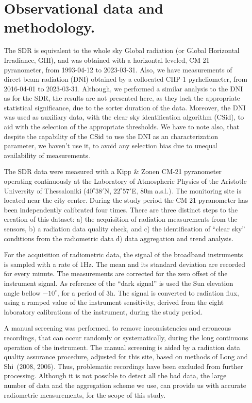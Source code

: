 \documentclass[
  preprint, 3p, authoryear]{article}
\begin{document}
\hypertarget{observational-data-and-methodology.}{%
\section{Observational data and methodology.}\label{observational-data-and-methodology.}}

The SDR is equivalent to the whole sky Global radiation (or Global Horizontal Irradiance, GHI), and was obtained with a horizontal leveled, CM-21 pyranometer, from
1993-04-12
to
2023-03-31.
Also, we have measurements of direct beam radiation (DNI) obtained by a collocated CHP-1 pyrheliometer, from
2016-04-01
to
2023-03-31.
Although, we performed a similar analysis to the DNI as for the SDR, the results are not presented here, as they lack the appropriate statistical significance, due to the sorter duration of the data.
Moreover, the DNI was used as auxiliary data, with the clear sky identification algorithm (CSid), to aid with the selection of the appropriate thresholds.
We have to note also, that despite the capability of the CSid to use the DNI as an characterization parameter, we haven't use it, to avoid any selection bias due to unequal availability of measurements.

The SDR data were measured with a Kipp \& Zonen CM-21 pyranometer operating continuously at the Laboratory of Atmospheric Physics of the Aristotle University of Thessaloniki (\(40^\circ38'\)N, \(22^\circ57'\)E, 80m a.s.l.).
The monitoring site is located near the city centre.
During the study period the CM-21 pyranometer has been independently calibrated four times.
There are three distinct steps to the creation of this dataset:
a) the acquisition of radiation measurements from the sensors,
b) a radiation data quality check, and
c) the identification of ``clear sky'' conditions from the radiometric data
d) data aggregation and trend analysis.

For the acquisition of radiometric data,
the signal of the broadband instruments is sampled with a rate of \(1 \text{Hz}\). The mean and its standard deviation are recorded for every minute.
The measurements are corrected for the zero offset of the instrument signal.
As reference of the ``dark signal'' is used the Sun elevation angle bellow \(-10^\circ\), for a period of \(3 \text{h}\).
The signal is converted to radiation flux, using a ramped value of the instrument sensitivity, derived from the eight laboratory calibrations of the instrument, during the study period.

A manual screening was performed, to remove inconsistencies and erroneous recordings, that can occur randomly or systematically, during the long continuous operation of the instrument.
The manual screening is aided by a radiation data quality assurance procedure, adjusted for this site, based on methods of Long and Shi~(2008, 2006).
Thus, problematic recordings have been excluded from further processing.
Although it is not possible to detect all the bad data, the large number of data and the aggregation scheme we use, can provide us with accurate radiometric measurements, for the scope of this study.
\end{document}
